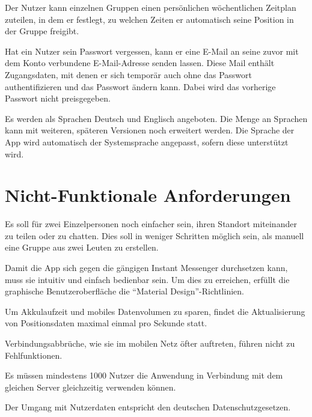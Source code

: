 \documentclass[parskip=full,11pt]{scrartcl}
\begin{document}
%
Der Nutzer kann einzelnen Gruppen einen persönlichen wöchentlichen Zeitplan
zuteilen, in dem er festlegt, zu welchen Zeiten er automatisch seine Position
in der Gruppe freigibt.

%
Hat ein Nutzer sein Passwort vergessen, kann er eine E-Mail an seine zuvor
mit dem Konto verbundene E-Mail-Adresse senden lassen.
Diese Mail enthält Zugangsdaten, mit denen er sich temporär auch ohne das
Passwort authentifizieren und das Passwort ändern kann.
Dabei wird das vorherige Passwort nicht preisgegeben.

Es werden als Sprachen Deutsch und Englisch angeboten.
Die Menge an Sprachen kann mit weiteren, späteren Versionen noch erweitert
werden.
Die Sprache der App wird automatisch der Systemsprache angepasst, sofern diese
unterstützt wird.

\pagebreak
\section{Nicht-Funktionale Anforderungen}

%
Es soll für zwei Einzelpersonen noch einfacher sein, ihren Standort miteinander
zu teilen oder zu chatten. Dies soll in weniger Schritten möglich sein, als
manuell eine Gruppe aus zwei Leuten zu erstellen.

Damit die App sich gegen die gängigen Instant Messenger durchsetzen kann, muss
sie intuitiv und einfach bedienbar sein. Um dies zu erreichen, erfüllt die
graphische Benutzeroberfläche die \enquote{Material Design}-Richtlinien.

Um Akkulaufzeit und mobiles Datenvolumen zu sparen, findet die Aktualisierung
von Positionsdaten maximal einmal pro Sekunde statt.

Verbindungsabbrüche, wie sie im mobilen Netz öfter auftreten, führen nicht zu
Fehlfunktionen.

Es müssen mindestens 1000 Nutzer die Anwendung in Verbindung mit dem gleichen
Server gleichzeitig verwenden können.

%
Der Umgang mit Nutzerdaten entspricht den deutschen Datenschutzgesetzen.
\end{document}
